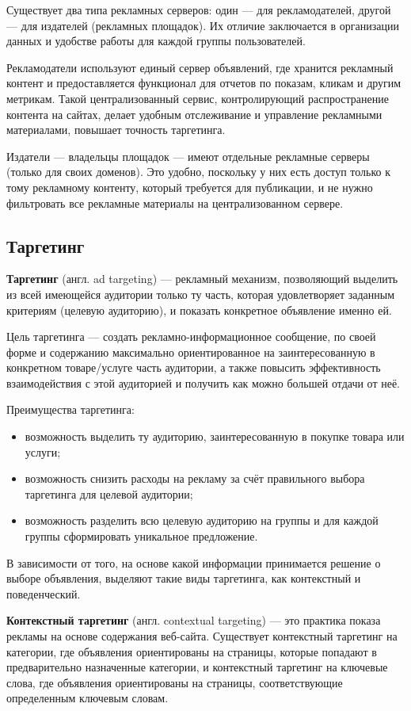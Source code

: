 \documentclass[specification,annotation,times]{itmo-student-thesis}
\begin{document}
Существует два типа рекламных серверов: один — для рекламодателей, другой — для издателей (рекламных площадок). Их отличие заключается в организации данных и удобстве работы для каждой группы пользователей.

Рекламодатели используют единый сервер объявлений, где хранится рекламный контент и предоставляется функционал для отчетов по показам, кликам и другим метрикам. Такой централизованный сервис, контролирующий распространение контента на сайтах, делает удобным отслеживание и управление рекламными материалами, повышает точность таргетинга.

Издатели — владельцы площадок — имеют отдельные рекламные серверы (только для своих доменов). Это удобно, поскольку у них есть доступ только к тому рекламному контенту, который требуется для публикации, и не нужно фильтровать все рекламные материалы на централизованном сервере.

\subsection{Таргетинг}

\textbf{Таргетинг} (англ. ad targeting)\label{targeting} — рекламный механизм, позволяющий выделить из всей имеющейся аудитории только ту часть, которая удовлетворяет заданным критериям (целевую аудиторию), и показать конкретное объявление именно ей.

Цель таргетинга — создать рекламно-информационное сообщение, по своей форме и содержанию максимально ориентированное на заинтересованную в конкретном товаре/услуге часть аудитории, а также повысить эффективность взаимодействия с этой аудиторией и получить как можно большей отдачи от неё.

Преимущества таргетинга:
\begin{itemize}
\item возможность выделить ту аудиторию, заинтересованную в покупке товара или услуги;
\item возможность снизить расходы на рекламу за счёт правильного выбора таргетинга для целевой аудитории;
\item возможность разделить всю целевую аудиторию  на группы и для каждой группы сформировать уникальное предложение.
\end{itemize}

В зависимости от того, на основе какой информации принимается решение о выборе объявления, выделяют такие виды таргетинга, как контекстный и поведенческий.

\textbf{Контекстный таргетинг} (англ. contextual targeting) \cite{contextual-targeting} — это практика показа рекламы на основе содержания веб-сайта. Существует контекстный таргетинг на категории, где объявления ориентированы на страницы, которые попадают в предварительно назначенные категории, и контекстный таргетинг на ключевые слова, где объявления ориентированы на страницы, соответствующие определенным ключевым словам. 
\end{document}
